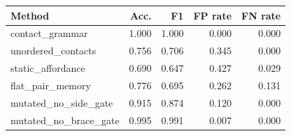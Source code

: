 \begin{tabular}{lrrrr}
\hline
Method & Acc. & F1 & FP rate & FN rate \\
\hline
contact\_grammar & 1.000 & 1.000 & 0.000 & 0.000 \\
unordered\_contacts & 0.756 & 0.706 & 0.345 & 0.000 \\
static\_affordance & 0.690 & 0.647 & 0.427 & 0.029 \\
flat\_pair\_memory & 0.776 & 0.695 & 0.262 & 0.131 \\
mutated\_no\_side\_gate & 0.915 & 0.874 & 0.120 & 0.000 \\
mutated\_no\_brace\_gate & 0.995 & 0.991 & 0.007 & 0.000 \\
\hline
\end{tabular}
